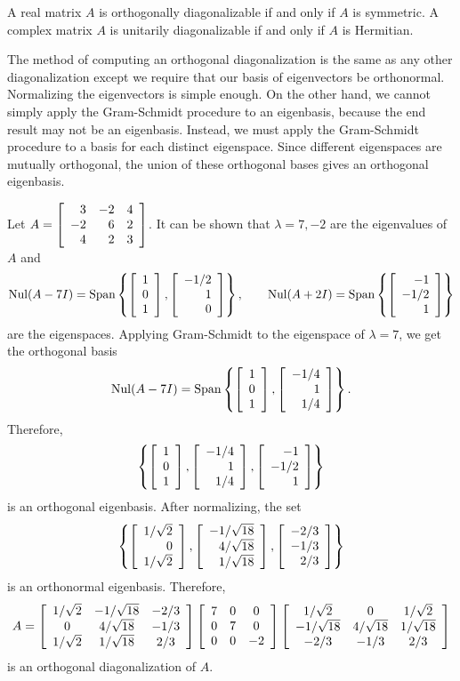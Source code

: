 \begin{Thm} A real matrix $A$ is orthogonally diagonalizable if and only if $A$ is symmetric. A complex matrix $A$ is unitarily diagonalizable if and only if $A$ is Hermitian.\end{Thm}

The method of computing an orthogonal diagonalization is the same as any other diagonalization except we require that our basis of eigenvectors be orthonormal. Normalizing the eigenvectors is simple enough. On the other hand, we cannot simply apply the Gram-Schmidt procedure to an eigenbasis, because the end result may not be an eigenbasis. Instead, we must apply the Gram-Schmidt procedure to a basis for each distinct eigenspace. Since different eigenspaces are mutually orthogonal, the union of these orthogonal bases gives an orthogonal eigenbasis.\\

\begin{Exam} Let $A = \mtx{rrr}{3&-2&4\\-2&6&2\\4&2&3}$. It can be shown that $\lambda = 7, -2$ are the eigenvalues of $A$ and 
\[\nul(A-7I) = \Span\left\{\vr{1\\0\\1}, \vr{-1/2\\1\\0}\right\},\qquad \nul(A+2I) =\Span\left\{\vr{-1\\-1/2\\1}\right\}\] are the eigenspaces. Applying Gram-Schmidt to the eigenspace of $\lambda =7$, we get the orthogonal basis 
\[\nul(A-7I) = \Span\left\{\vr{1\\0\\1}, \vr{-1/4\\1\\1/4}\right\}.\] Therefore, \[\left\{\vr{1\\0\\1}, \vr{-1/4\\1\\1/4}, \vr{-1\\-1/2\\1}\right\}\] is an orthogonal eigenbasis. After normalizing, the set \[\left\{\vr{1/\sqrt{2}\\0\\1/\sqrt{2}}, \vr{-1/\sqrt{18}\\4/\sqrt{18}\\1/\sqrt{18}}, \vr{-2/3\\-1/3\\2/3}\right\}\] is an orthonormal eigenbasis. Therefore, 
\[A= \mtx{ccc}{1/\sqrt{2}&-1/\sqrt{18} &-2/3  \\0 &4/\sqrt{18} &-1/3 \\1/\sqrt{2} &1/\sqrt{18} &2/3}\mtx{ccc}{7&0&0\\0&7&0\\0&0&-2}\mtx{ccc}{1/\sqrt{2}&0&1/\sqrt{2}\\ -1/\sqrt{18}&4/\sqrt{18}&1/\sqrt{18}\\ -2/3&-1/3&2/3}\] is an orthogonal diagonalization of $A$.
\end{Exam}

